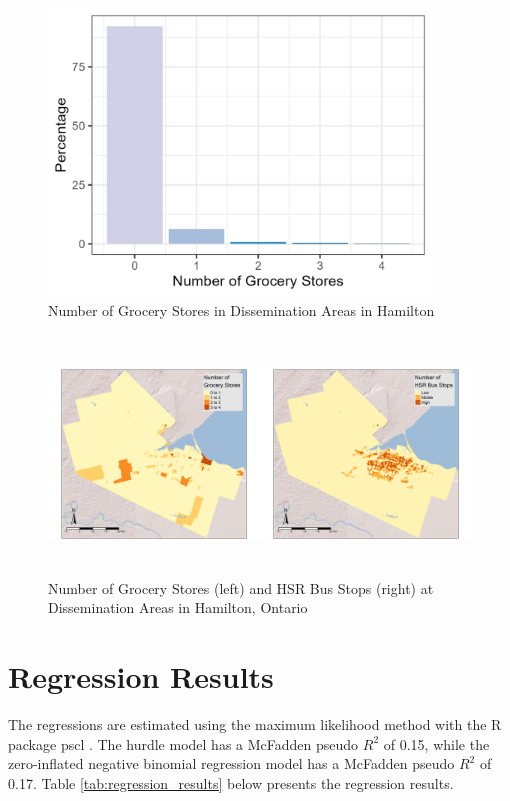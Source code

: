 \documentclass[preprint, 3p,
authoryear]{elsarticle} %
\begin{document}
\begin{figure}

{\centering \includegraphics[width=4in,height=3in]{./images/dep} 

}

\caption{\label{fig:dep}Number of Grocery Stores in Dissemination Areas in Hamilton}\label{fig:unnamed-chunk-10}
\end{figure}

\begin{figure}

{\centering \includegraphics[width=6in,height=2.5in]{./images/descriptive} 

}

\caption{\label{fig:descriptive}Number of Grocery Stores (left) and HSR Bus Stops (right) at Dissemination Areas in Hamilton, Ontario}\label{fig:unnamed-chunk-13}
\end{figure}

\section{Regression Results}\label{regression-results}

The regressions are estimated using the maximum likelihood method with
the R package pscl \citep{pscl}. The hurdle model has a McFadden pseudo
\(R^2\) of 0.15, while the zero-inflated negative binomial regression
model has a McFadden pseudo \(R^2\) of 0.17. Table
\ref{tab:regression_results} below presents the regression results.
\end{document}
